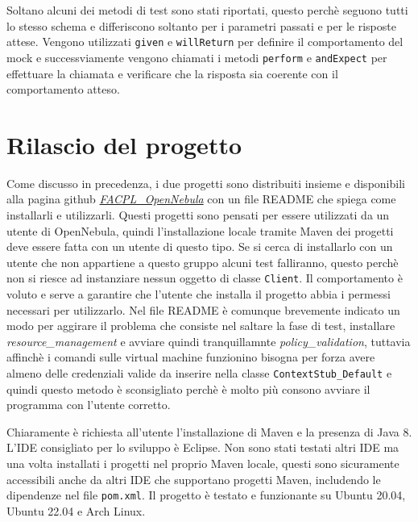 Soltano alcuni dei metodi di test sono stati riportati, questo perchè seguono tutti lo stesso schema e differiscono soltanto per i parametri passati e per le risposte attese. Vengono utilizzati \texttt{given} e \texttt{willReturn} per definire il comportamento del mock e successviamente vengono chiamati i metodi \texttt{perform} e \texttt{andExpect} per effettuare la chiamata e verificare che la risposta sia coerente con il comportamento atteso.

\section{Rilascio del progetto}
Come discusso in precedenza, i due progetti sono distribuiti insieme e disponibili alla pagina github \href{https://github.com/alienix2/FACPL_Opennebula_thesis}{\emph{FACPL\_OpenNebula}} con un file README che spiega come installarli e utilizzarli. Questi progetti sono pensati per essere utilizzati da un utente di OpenNebula, quindi l'installazione locale tramite Maven dei progetti deve essere fatta con un utente di questo tipo. Se si cerca di installarlo con un utente che non appartiene a questo gruppo alcuni test falliranno, questo perchè non si riesce ad instanziare nessun oggetto di classe \texttt{Client}. Il comportamento è voluto e serve a garantire che l'utente che installa il progetto abbia i permessi necessari per utilizzarlo. Nel file README è comunque brevemente indicato un modo per aggirare il problema che consiste nel saltare la fase di test, installare \emph{resource\_management} e avviare quindi tranquillamnte \emph{policy\_validation}, tuttavia affinchè i comandi sulle virtual machine funzionino bisogna per forza avere almeno delle credenziali valide da inserire nella classe \texttt{ContextStub\_Default} e quindi questo metodo è sconsigliato perchè è molto più consono avviare il programma con l'utente corretto.\par
Chiaramente è richiesta all'utente l'installazione di Maven e la presenza di Java 8. L'IDE consigliato per lo sviluppo è Eclipse. Non sono stati testati altri IDE ma una volta installati i progetti nel proprio Maven locale, questi sono sicuramente accessibili anche da altri IDE che supportano progetti Maven, includendo le dipendenze nel file \texttt{pom.xml}. Il progetto è testato e funzionante su Ubuntu 20.04, Ubuntu 22.04 e Arch Linux.